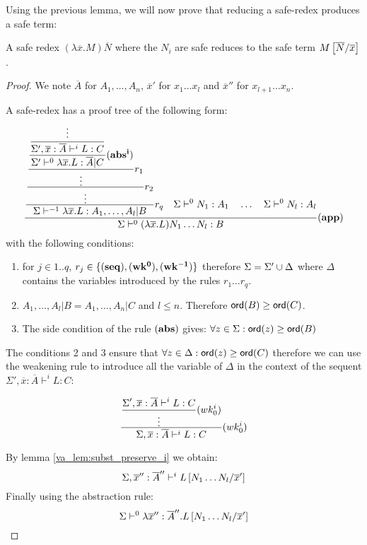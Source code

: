 

Using the previous lemma, we will now prove that reducing a
safe-redex produces a safe term:

\begin{lem}
\label{va_lem:safereduction} A safe redex $(\lambda \overline{x} . M )
\overline{N}$ where the $N_i$ are safe reduces to the safe term
$M\left[ \overline{N}/\overline{x} \right]$.
\end{lem}

\begin{proof}

We note $\overline{A}$ for $A_1, \ldots , A_n$, $\overline{x}'$ for
$x_1 \ldots x_l$ and $\overline{x}''$ for $x_{l+1} \ldots x_n$.

A safe-redex has a proof tree of the following form:
$$
   \frac{\displaystyle 
        \frac{\displaystyle 
            \frac{\displaystyle 
                \frac{\displaystyle 
                    \frac{\displaystyle  \frac{\displaystyle \vdots}{\Sigma',\overline{x}:\overline{A}\vdash^i L:C  }
                        }{\Sigma' \vdash^0 \lambda \overline{x} . L : \overline{A}|C} \mathbf{(abs^i)}
                }{\vdots} r_1
            }{\vdots} r_2
            }{ \Sigma \vdash^{-1} \lambda \overline{x} . L : A_1, \ldots , A_l|B} r_q
            \quad
            \Sigma \vdash^0 N_1 : A_1
            \quad \ldots \quad \Sigma \vdash^0 N_l : A_l
    }{
       \Sigma \vdash^0 (\lambda \overline{x} . L) N_1 \ldots N_l : B
    } (\mathbf{app})
$$
with the following conditions:
\begin{enumerate}
\item for $j\in 1..q$, $r_j \in \{ \mathbf{(seq)}, \mathbf{(wk^0)}, \mathbf{(wk^{-1})} \}$ therefore
$\Sigma = \Sigma' \cup \Delta$ where $\Delta$ contains the
variables introduced by the rules $r_1 \ldots r_q$.

\item $A_1, \ldots , A_l|B = A_1, \ldots , A_n|C$ and $l\leq n$. Therefore
${\sf ord}(B) \geq {\sf ord}(C)$.
\item The side condition of the rule $\mathbf{(abs)}$ gives: $\forall z \in \Sigma : {\sf ord}(z) \geq {\sf ord}(B)$
\end{enumerate}


The conditions 2 and 3 ensure that $\forall z \in \Delta : {\sf ord}(z)
\geq {\sf ord}(C)$ therefore we can use the weakening rule to introduce
all the variable of $\Delta$ in the context of the sequent
$\Sigma',\overline{x}:\overline{A}\vdash^i L:C$:

$$\frac{\displaystyle \frac{\displaystyle  \Sigma',\overline{x}:\overline{A}\vdash^i L:C  }{\vdots} (wk^i_0)}{\Sigma,\overline{x}:\overline{A}\vdash^i L:C} (wk^i_0)
$$

By lemma \ref{va_lem:subst_preserve_i} we obtain:
$$ \Sigma, \overline{x}'':\overline{A}'' \vdash^i L\left[ N_1 \ldots N_l/\overline{x}' \right]$$
Finally using the abstraction rule:
$$ \Sigma \vdash^0 \lambda \overline{x}'':\overline{A}'' . L\left[ N_1 \ldots N_l/\overline{x}' \right]$$
\end{proof}




